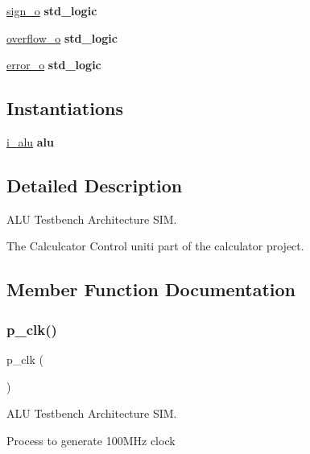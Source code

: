 \begin{DoxyCompactItemize}
\item 
\hyperlink{classtb__alu_1_1sim_af79695f4ad70e8ad8db0623ecd408492}{sign\+\_\+o} {\bfseries \textcolor{comment}{std\+\_\+logic}\textcolor{vhdlchar}{ }} 
\item 
\hyperlink{classtb__alu_1_1sim_ae42e6c3352339b3983bdd4a7df3d0c65}{overflow\+\_\+o} {\bfseries \textcolor{comment}{std\+\_\+logic}\textcolor{vhdlchar}{ }} 
\item 
\hyperlink{classtb__alu_1_1sim_aea39ae165b49f7a12978d9290d22ff85}{error\+\_\+o} {\bfseries \textcolor{comment}{std\+\_\+logic}\textcolor{vhdlchar}{ }} 
\end{DoxyCompactItemize}
\subsection*{Instantiations}
 \begin{DoxyCompactItemize}
\item 
\hyperlink{classtb__alu_1_1sim_a9782fd33327dd4a14d723cbf74b8cea0}{i\+\_\+alu}  {\bfseries alu}   
\end{DoxyCompactItemize}


\subsection{Detailed Description}
A\+LU Testbench Architecture S\+IM. 

The Calculcator Control uniti part of the calculator project. 

\subsection{Member Function Documentation}
\mbox{\label{classtb__alu_1_1sim_af35c81fcf5e4601a4e5d669b422cf79a}} 
\subsubsection{\texorpdfstring{p\+\_\+clk()}{p\_clk()}}
{\footnotesize\ttfamily p\+\_\+clk (\begin{DoxyParamCaption}{ }\end{DoxyParamCaption})}



A\+LU Testbench Architecture S\+IM. 

Process to generate 100\+M\+Hz clock \mbox{\label{classtb__alu_1_1sim_a0f40b896b2461e250ebafd4e27b8ff54}} 
